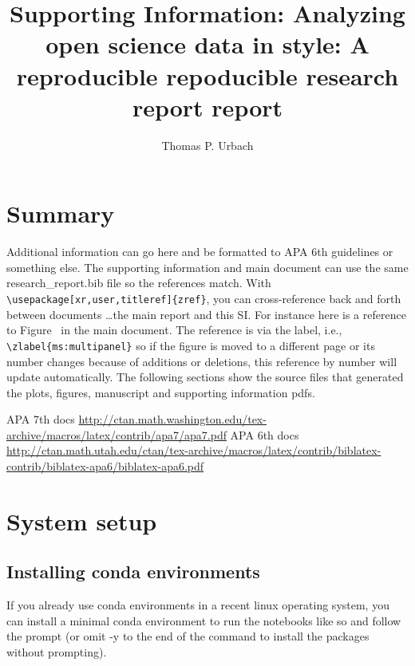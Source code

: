 \documentclass[letter,doc,natbib,11pt]{apa7}  %
\title{Supporting Information: Analyzing open science data in style: A reproducible repoducible research report report}
\author{Thomas P. Urbach}
\affiliation{Kutas Lab \\ Cognitive Science Department \\ University of California, San Diego}
\begin{document}
\maketitle

\tableofcontents

\section{Summary}

Additional information can go here and be formatted to APA 6th
guidelines or something else. The supporting information and main
document can use the same research\_report.bib file so the references
match. With {\tt \textbackslash usepackage[xr,user,titleref]\{zref\}},
you can cross-reference back and forth between documents \ldots the
main report and this SI. For instance here is a reference to
Figure~ in the main document. The reference is via the
label, i.e., {\tt \textbackslash zlabel\{ms:multipanel\}} so if the figure
is moved to a different page or its number changes because of
additions or deletions, this reference by number will update
automatically. The following sections show the source files that
generated the plots, figures, manuscript and supporting information pdfs.


APA 7th docs \url{http://ctan.math.washington.edu/tex-archive/macros/latex/contrib/apa7/apa7.pdf}
APA 6th docs \url{http://ctan.math.utah.edu/ctan/tex-archive/macros/latex/contrib/biblatex-contrib/biblatex-apa6/biblatex-apa6.pdf}




% 
% 
% 
% 
% 



\section{System setup}

\subsection{Installing conda environments}

If you already use conda environments in a recent linux operating
system, you can install a minimal conda environment to run the
notebooks like so and follow the prompt (or omit -y to the end of the
command to install the packages without prompting).
\end{document}
